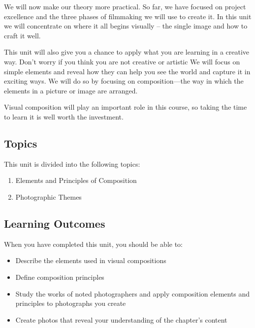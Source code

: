 \documentclass[
]{book}
\providecommand{\tightlist}{%
  \setlength{\itemsep}{0pt}\setlength{\parskip}{0pt}}
\begin{document}
We will now make our theory more practical. So far, we have focused on project excellence and the three phases of filmmaking we will use to create it. In this unit we will concentrate on where it all begins visually -- the single image and how to craft it well.

This unit will also give you a chance to apply what you are learning in a creative way. Don't worry if you think you are not creative or artistic We will focus on simple elements and reveal how they can help you see the world and capture it in exciting ways. We will do so by focusing on composition---the way in which the elements in a picture or image are arranged.

Visual composition will play an important role in this course, so taking the time to learn it is well worth the investment.

\hypertarget{topics-2}{%
\subsection*{Topics}\label{topics-2}}

This unit is divided into the following topics:

\begin{enumerate}
\def\labelenumi{\arabic{enumi}.}
\tightlist
\item
  Elements and Principles of Composition
\item
  Photographic Themes
\end{enumerate}

\hypertarget{learning-outcomes-2}{%
\subsection*{Learning Outcomes}\label{learning-outcomes-2}}

When you have completed this unit, you should be able to:

\begin{itemize}
\tightlist
\item
  Describe the elements used in visual compositions\\
\item
  Define composition principles\\
\item
  Study the works of noted photographers and apply composition elements and principles to photographs you create\\
\item
  Create photos that reveal your understanding of the chapter's content
\end{itemize}
\end{document}
